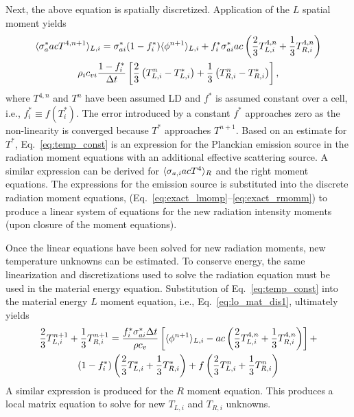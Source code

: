 Next, the above equation is spatially discretized.  Application of the $L$ spatial
moment yields
\begin{multline}\label{eq:temp_const}
    \langle \sigma_a^* a c T^{4,n+1} \rangle_{L,i} = \sigma^*_{ai}(1-f_i^*)\langle \phi^{n+1} \rangle_{L,i} +
    f_i^*
    \sigma^*_{ai} a c \left(\frac{2}{3} T_{L,i}^{4,n} + \frac{1}{3} T_{R,i}^{4,n}\right)
    \\ \rho_i c_{vi} \frac{1 - f^*_i}{\Delta t} \left[\frac{2}{3}\left(T^n_{L,i} -
        T^*_{L,i}\right) + \frac{1}{3}\left(T^n_{R,i} -
    T^*_{R,i}\right)\right],
\end{multline}
where $T^{4,n}$ and $T^{n}$ have been assumed LD and $f^*$ is assumed constant over a cell, i.e., $f^*_i
\equiv f(T_i^*)$.
The error introduced by a constant $f^*$ approaches zero as the
non-linearity is converged because $T^*$ approaches $T^{n+1}$. 
Based on an estimate for $T^*$, Eq.~\eqref{eq:temp_const} is an expression for
the Planckian emission source in the radiation moment equations with an additional effective scattering source.
A similar expression can be derived for $\langle \sigma_{a,i} a c T^4 \rangle_R$ and the right
moment equations.
The expressions for the emission source is substituted into the discrete radiation moment equations,
(Eq.~\eqref{eq:exact_lmomp}--\eqref{eq:exact_rmomm}) to produce a
linear system of equations for the new radiation intensity moments (upon closure of the moment equations). 

Once the linear equations have been solved for new radiation moments, new temperature
unknowns can be estimated.  To conserve energy, the same linearization and discretizations used to
solve the radiation equation must be used in the material energy equation.
Substitution of Eq.~\eqref{eq:temp_const} into the material energy $L$ moment equation, i.e., Eq.~\eqref{eq:lo_mat_dis1},
ultimately yields
\begin{multline}\label{eq:new_temp}
    \frac{2}{3}T_{L,i}^{n+1} + \frac{1}{3}T_{R,i}^{n+1}= \frac{f_i^* \sigma_{ai}^* \Delta
t}{\rho c_{v}}  \left[ \langle \phi^{n+1} \rangle_{L,i}  - a c\left(\frac{2}{3} T_{L,i}^{4,n} + \frac{1}{3} T_{R,i}^{4,n}\right)
\right] + \\ (1- f^*_{i})\left(\frac{2}{3}T^*_{L,i} + \frac{1}{3}T^*_{R,i}\right) + f
\left(\frac{2}{3}T^n_{L,i} + \frac{1}{3}T^n_{R,i}\right)
\end{multline}
A similar expression is produced for the $R$ moment equation.  This produces a local
matrix equation to solve for new $T_{L,i}$ and $T_{R,i}$ unknowns.  

